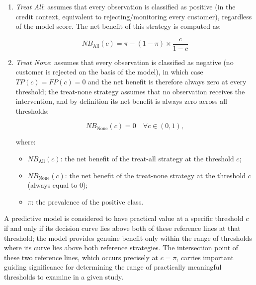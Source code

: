 \vspace{1em}
\begin{enumerate}
    \item \textit{Treat All}: assumes that every observation is classified as positive (in the credit context, equivalent to rejecting/monitoring every customer), regardless of the model score. The net benefit of this strategy is computed as:

    \begin{equation}
        NB_{\text{All}}(c) = \pi - (1-\pi)\times\frac{c}{1-c}
    \end{equation}

    \item \textit{Treat None}: assumes that every observation is classified as negative (no customer is rejected on the basis of the model), in which case $TP(c)=FP(c)=0$ and the net benefit is therefore always zero at every threshold; the treat-none strategy assumes that no observation receives the intervention, and by definition its net benefit is always zero across all thresholds:
    
    \begin{equation}
        NB_{\text{None}}(c) = 0 \quad \forall c \in (0,1),
    \end{equation}
    
    \vspace{1em}
    where:
    \begin{itemize}
        \item $NB_{\text{All}}(c) $: the net benefit of the treat-all strategy at the threshold $c$;
        \item $NB_{\text{None}}(c)$: the net benefit of the treat-none strategy at the threshold $c$ (always equal to 0);
        \item $\pi$: the prevalence of the positive class.
    \end{itemize}

\end{enumerate}

A predictive model is considered to have practical value at a specific threshold $c$ if and only if its decision curve lies above both of these reference lines at that threshold; the model provides genuine benefit only within the range of thresholds where its curve lies above both reference strategies. The intersection point of these two reference lines, which occurs precisely at $c = \pi$, carries important guiding significance for determining the range of practically meaningful thresholds to examine in a given study.

